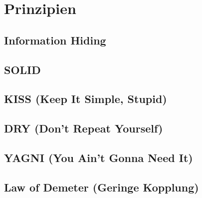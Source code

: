 \documentclass[../main.tex]{subfiles}
\begin{document}
	
	\section{Prinzipien}
	
	\subsection{Information Hiding}
	\clearpage
	
	\subsection{SOLID}
	\clearpage
	
	\subsection{KISS (Keep It Simple, Stupid)}
	\clearpage
	
	\subsection{DRY (Don't Repeat Yourself)}
	\clearpage

	\subsection{YAGNI (You Ain't Gonna Need It)}
	\clearpage	
	
	\subsection{Law of Demeter (Geringe Kopplung)}
	\clearpage
\end{document}
